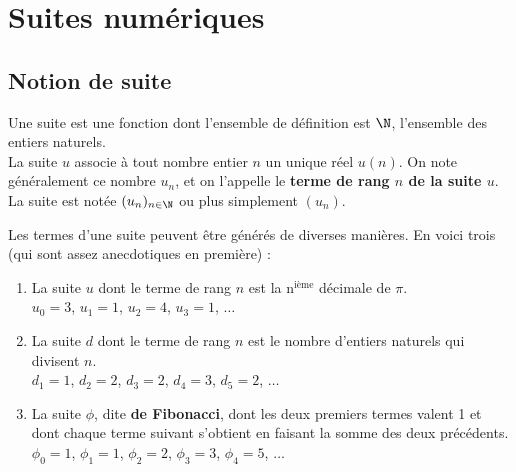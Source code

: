 \documentclass[a4paper,11pt,cours]{nsi} %
\begin{document}
\setcounter{chapter}{2} %

\chapter{Suites numériques}


\setcounter{chapter}{2} %
\setlength{\columnseprule}{0.5pt}
\setlength{\columnsep}{1cm}





\section{Notion de suite}
\begin{definition}[ : suite]
	Une suite est une fonction dont l'ensemble de définition est $\N$, l'ensemble des entiers naturels.\\
	La suite $u$ associe à tout nombre entier $n$ un unique réel $u(n)$. On note généralement ce nombre $u_n$, et on
	l'appelle le \textbf{terme de rang $n$ de la suite $u$}.\\
	La suite est notée $(u_n)_{n\in\N}$ ou plus simplement $(u_n)$.
\end{definition}

\begin{exemple}
	Les termes d'une suite peuvent être générés de diverses manières. En voici trois (qui sont assez anecdotiques en première) :
	\begin{enumerate}[label=\textbullet]
		\item 	La suite $u$ dont le terme de rang $n$ est la  n$^{\text{ième}}$ décimale de $\pi$.\\
		$u_0=3$, $u_1=1$, $u_2=4$, $u_3=1$, $\ldots$
		\item 	La suite $d$ dont le terme de rang $n$ est le nombre d'entiers naturels qui divisent $n$.\\
		$d_1=1$, $d_2=2$, $d_3=2$, $d_4=3$, $d_5=2$, $\ldots$
		\item 	La suite $\phi$, dite \textbf{de Fibonacci}, dont les deux premiers termes valent 1 et dont chaque terme suivant s'obtient en faisant
		la somme des deux précédents.\\
		$\phi_0=1$, $\phi_1=1$, $\phi_2=2$, $\phi_3=3$, $\phi_4=5$, $\ldots$
	\end{enumerate}
\end{exemple}
\end{document}
